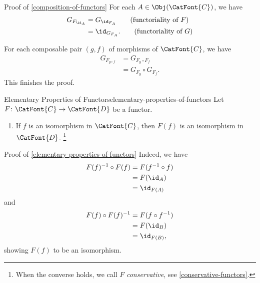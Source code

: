 \begin{Proof}{Proof of \cref{composition-of-functors}}%
    For each $A\in\Obj(\CatFont{C})$, we have
    \begin{align*}
        G_{F_{\id_{A}}} &= G_{\id_{F_{A}}}\tag{functoriality of $F$}\\
                        &= \id_{G_{F_{A}}}.\tag{functoriality of $G$}
    \end{align*}

    For each composable pair $(g,f)$ of morphisms of $\CatFont{C}$, we have
    \begin{align*}
        G_{F_{g\circ f}} &= G_{F_{g}\circ F_{f}}\tag{functoriality of $F$}\\
                         &= G_{F_{g}}\circ G_{F_{f}}.\tag{functoriality of $G$}
    \end{align*}
    This finishes the proof.
\end{Proof}
\begin{proposition}{Elementary Properties of Functors}{elementary-properties-of-functors}%
    Let $F\colon\CatFont{C}\to\CatFont{D}$ be a functor.
    \begin{enumerate}
        \item\label{elementary-properties-of-functors-preservation-of-isomorphisms}If $f$ is an isomorphism in $\CatFont{C}$, then $F(f)$ is an isomorphism in $\CatFont{D}$.%
            \footnote{%
                When the converse holds, we call $F$ \emph{conservative}, see \cref{conservative-functors}.
                \par\vspace*{\TCBBoxCorrection}
            }%
    \end{enumerate}
\end{proposition}
\begin{Proof}{Proof of \cref{elementary-properties-of-functors}}%
    Indeed, we have
    \begin{align*}
        F(f)^{-1}\circ F(f) &= F(f^{-1}\circ f)\\
                            &= F(\id_{A})\\
                            &= \id_{F(A)}
    \end{align*}
    and
    \begin{align*}
        F(f)\circ F(f)^{-1} &= F(f\circ f^{-1})\\
                            &= F(\id_{B})\\
                            &= \id_{F(B)},
    \end{align*}
    showing $F(f)$ to be an isomorphism.
\end{Proof}
